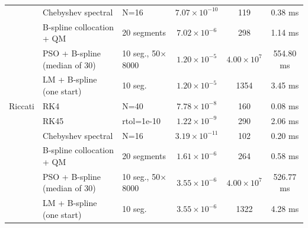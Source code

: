 \begin{tabular}{lllccc}
 & Chebyshev spectral & N=16 & $7.07\times10^{-10}$ & 119 & 0.38 ms\\
 & B-spline collocation + QM & 20 segments & $7.02\times10^{-6}$ & 298 & 1.14 ms\\
 & PSO + B-spline (median of 30) & 10 seg., 50$\times$8000 & $1.20\times10^{-5}$ & $4.00\times10^{7}$ & 554.80 ms\\
 & LM + B-spline (one start) & 10 seg. & $1.20\times10^{-5}$ & 1354 & 3.45 ms\\
\addlinespace
Riccati & RK4 & N=40 & $7.78\times10^{-8}$ & 160 & 0.08 ms\\
 & RK45 & rtol=1e-10 & $1.22\times10^{-9}$ & 290 & 2.06 ms\\
 & Chebyshev spectral & N=16 & $3.19\times10^{-11}$ & 102 & 0.20 ms\\
 & B-spline collocation + QM & 20 segments & $1.61\times10^{-6}$ & 264 & 0.58 ms\\
 & PSO + B-spline (median of 30) & 10 seg., 50$\times$8000 & $3.55\times10^{-6}$ & $4.00\times10^{7}$ & 526.77 ms\\
 & LM + B-spline (one start) & 10 seg. & $3.55\times10^{-6}$ & 1322 & 4.28 ms\\
\bottomrule
\end{tabular}